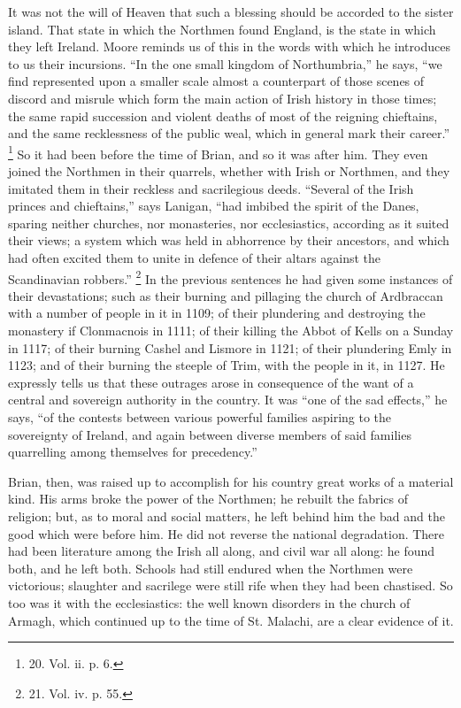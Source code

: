 It was not the will of Heaven
that such a blessing should be accorded to the sister island. That
state in which the Northmen found England, is the state in which
they left Ireland. Moore reminds us of this in the words with which he
introduces to us their incursions. ``In the one small kingdom of
Northumbria,'' he says, ``we find represented upon a smaller scale
almost a counterpart of those scenes of discord and misrule which form
the main action of Irish history in those times; the same rapid
succession and violent deaths of most of the reigning chieftains, and
the same recklessness of the public weal, which in general mark their
career.'' \footnote{20.
Vol. ii. p. 6.} So it had
been before the time of Brian, and so it was after him. They even
joined the Northmen in their quarrels, whether with Irish or Northmen,
and they imitated them in their reckless and sacrilegious deeds. ``Several
of the Irish princes and chieftains,'' says Lanigan, ``had imbibed the
spirit of the Danes, sparing neither churches, nor monasteries, nor
ecclesiastics, according as it suited their views; a system which was
held in abhorrence by their ancestors, and which had often excited
them to unite in defence of their altars against the Scandinavian
robbers.'' \footnote{21.
Vol. iv. p. 55.} In the
previous sentences he had given some instances of their devastations;
such as their burning and pillaging the church of Ardbraccan with a
number of people in it in 1109; of their plundering and destroying the
monastery if Clonmacnois in 1111; of their killing the Abbot of Kells
on a Sunday in 1117; of their burning Cashel and Lismore in 1121; of
their plundering Emly in 1123; and of their burning the steeple of
Trim, with the people in it, in 1127. He expressly tells us that these
outrages arose in consequence of the want of a central and sovereign
authority in the country. It was ``one of the sad effects,'' he
says, ``of the contests between various powerful families aspiring to
the sovereignty of Ireland, and again between diverse members of
said families quarrelling among themselves for precedency.''

Brian, then, was raised up to
accomplish for his country great works of a material kind. His arms
broke the power of the Northmen; he rebuilt the fabrics of religion;
but, as to moral and social matters, he left behind him the bad and
the good which were before him. He did not reverse the national
degradation. There had been literature among the Irish all along, and
civil war all along: he found both, and he left both. Schools had
still endured when the Northmen were victorious; slaughter and
sacrilege were still rife when they had been chastised. So too was it
with the ecclesiastics: the well known disorders in the church of
Armagh, which continued up to the time of St. Malachi, are a clear
evidence of it.


